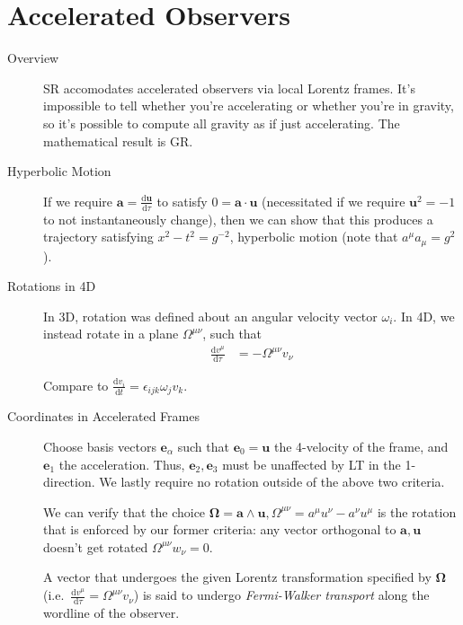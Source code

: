 \documentclass[12pt]{report}
\newcommand{\rd}[2]{\frac{\mathrm{d}#1}{\mathrm{d}#2}}
\newcommand{\bm}[1]{\boldsymbol{\mathbf{#1}}}
\begin{document}
\section{Accelerated Observers}

\begin{description}
    \item[Overview] SR accomodates accelerated observers via local Lorentz
        frames. It's impossible to tell whether you're accelerating or whether
        you're in gravity, so it's possible to compute all gravity as if just
        accelerating. The mathematical result is GR\@.

    \item[Hyperbolic Motion] If we require $\bm{a} = \rd{\bm{u}}{\tau}$ to
        satisfy $0 = \bm{a} \cdot \bm{u}$ (necessitated if we require
        $\bm{u}^2 = -1$ to not instantaneously change), then we can show
        that this produces a trajectory satisfying $x^2 - t^2 = g^{-2}$,
        hyperbolic motion (note that $a^\mu a_\mu = g^2$).

    \item[Rotations in 4D] In 3D, rotation was defined about an angular velocity
        vector $\omega_i$. In 4D, we instead rotate in a plane
        $\Omega^{\mu\nu}$, such that
        \begin{align}
            \rd{v^\mu}{\tau} &= -\Omega^{\mu\nu}v_\nu
        \end{align}

        Compare to $\rd{v_i}{t} = \epsilon_{ijk} \omega_j v_k$.

    \item[Coordinates in Accelerated Frames] Choose basis vectors
        $\bm{e}_\alpha$ such that $\bm{e}_0 = \bm{u}$ the 4-velocity
        of the frame, and $\bm{e}_1$ the acceleration. Thus, $\bm{e}_2,
        \bm{e}_3$ must be unaffected by LT in the 1-direction. We lastly
        require no rotation outside of the above two criteria.

        We can verify that the choice $\bm{\Omega} = \bm{a} \wedge
        \bm{u}, \Omega^{\mu\nu} = a^\mu u^\nu - a^\nu u^\mu$ is the rotation
        that is enforced by our former criteria: any vector orthogonal to
        $\bm{a}, \bm{u}$ doesn't get rotated $\Omega^{\mu\nu}w_\nu = 0$.

        A vector that undergoes the given Lorentz transformation specified by
        $\bm{\Omega}$ (i.e.\ $\rd{v^\mu}{\tau} = \Omega^{\mu\nu}v_\nu$) is
        said to undergo \emph{Fermi-Walker transport} along the wordline of the
        observer.


\end{description}
\end{document}
